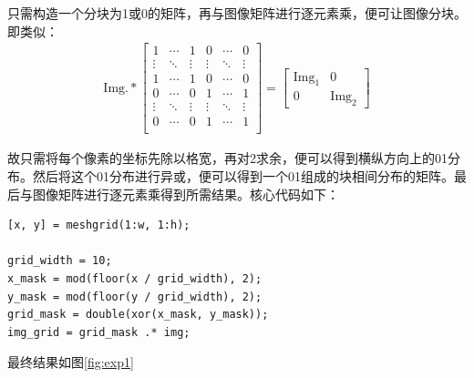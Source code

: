 \documentclass[10pt, a4paper]{article}
\begin{document}
\begin{enumerate}[(a)]
          只需构造一个分块为1或0的矩阵，再与图像矩阵进行逐元素乘，便可让图像分块。即类似：
          \begin{align*}
              \text{Img} .*
              \begin{bmatrix}
                  1      & \cdots & 1      & 0      & \cdots & 0      \\
                  \vdots & \ddots & \vdots & \vdots & \ddots & \vdots \\
                  1      & \cdots & 1      & 0      & \cdots & 0      \\
                  0      & \cdots & 0      & 1      & \cdots & 1      \\
                  \vdots & \ddots & \vdots & \vdots & \ddots & \vdots \\
                  0      & \cdots & 0      & 1      & \cdots & 1      \\
              \end{bmatrix}
              =
              \begin{bmatrix}
                  \text{Img}_1 & 0            \\
                  0            & \text{Img}_2
              \end{bmatrix}
          \end{align*}

          故只需将每个像素的坐标先除以格宽，再对2求余，便可以得到横纵方向上的01分布。然后将这个01分布进行异或，便可以得到一个01组成的块相间分布的矩阵。最后与图像矩阵进行逐元素乘得到所需结果。核心代码如下：

          \begin{verbatim}
[x, y] = meshgrid(1:w, 1:h);

grid_width = 10;
x_mask = mod(floor(x / grid_width), 2);
y_mask = mod(floor(y / grid_width), 2);
grid_mask = double(xor(x_mask, y_mask));
img_grid = grid_mask .* img;
          \end{verbatim}
\end{enumerate}

最终结果如图\ref{fig:exp1}
\end{document}
